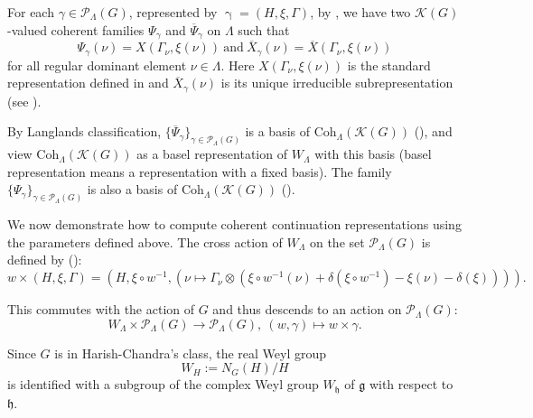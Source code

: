 \documentclass[12pt, a4paper]{amsart}
\numberwithin{equation}{section}
\newcommand{\CK}{{\mathcal {K}}}
\newcommand{\CP}{{\mathcal {P}}}
\newcommand{\fg}{\mathfrak{g}}
\newcommand{\fh}{\mathfrak{h}}
\renewcommand{\bar}{\overline}
\begin{document}
For each $\gamma \in \CP_{\Lambda}(G)$, represented by $\upgamma = (H,\xi,\Gamma)$, by \cite[Theorem 8.2.1]{Vog81}, we have two $\CK(G)$-valued coherent families $\Psi_{\gamma}$ and $\bar{\Psi}_{\gamma}$ on $\Lambda$ such that
$$\Psi_{\gamma}(\nu) = X(\Gamma_{\nu},\xi(\nu)) \ \textrm{and}  \ \bar{X}_{\gamma}(\nu) = \bar{X}(\Gamma_{\nu},\xi(\nu))$$
for all regular dominant element $\nu \in \Lambda$. Here $X(\Gamma_{\nu},\xi(\nu))$ is the standard representation defined in \cite[Notation Convention 6.6.3]{Vog81} and $\bar{X}_{\gamma}(\nu)$ is its unique irreducible subrepresentation (see \cite[Theorem 6.5.12]{Vog81}).

By Langlands classification, $\{ \bar{\Psi}_{\gamma} \}_{\gamma \in \CP_{\Lambda}(G)}$ is a basis of $\mathrm{Coh}_{\Lambda}(\CK(G))$ (\cite[Proposition 6.6.7]{Vog81}), and view $\mathrm{Coh}_{\Lambda}(\CK(G))$ as a basel representation of $W_{\Lambda}$ with this basis  (basel representation means a representation with a fixed basis). The family $\{ \Psi_{\gamma} \}_{\gamma \in \CP_{\Lambda}(G)}$ is also a basis of $\mathrm{Coh}_{\Lambda}(\CK(G))$ (\cite[Theorem 6.5.12]{Vog81}).

We now demonstrate how to compute coherent continuation representations using the parameters defined above.
The cross action of $W_{\Lambda}$ on the set $\mathscr{P}_{\Lambda}(G)$ is defined by (\cite[Definition 4.2]{Vog82}):
\begin{equation}
    w \times (H, \xi, \Gamma) = (H, \xi \circ w^{-1}, (\nu \mapsto \Gamma_{\nu} \otimes (\xi \circ w^{-1}(\nu) + \delta(\xi \circ w^{-1}) - \xi (\nu) - \delta(\xi)))).
\end{equation}

This commutes with the action of $G$ and thus descends to an action on $\CP_{\Lambda}(G)$:
\begin{equation}
    W_{\Lambda} \times \CP_{\Lambda}(G) \to \CP_{\Lambda}(G), \ (w,\gamma) \mapsto w \times \gamma.
\end{equation}

Since $G$ is in Harish-Chandra's class, the real Weyl group
\begin{equation}
    W_{H} := N_{G}(H)/H
\end{equation}
is identified with a subgroup of the complex Weyl group $W_{\fh}$ of $\fg$ with respect to $\fh$.
\end{document}
